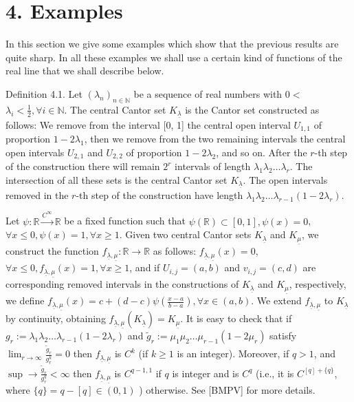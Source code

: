 \documentclass[10pt]{article}
\begin{document}
\section*{4. Examples}
In this section we give some examples which show that the previous results are quite sharp. In all these examples we shall use a certain kind of functions of the real line that we shall describe below.

Definition 4.1. Let $\left(\lambda_{n}\right)_{n \in \mathbb{N}}$ be a sequence of real numbers with $0<$ $\lambda_{i}<\frac{1}{2}, \forall i \in \mathbb{N}$. The central Cantor set $K_{\underline{\lambda}}$ is the Cantor set constructed as follows: We remove from the interval [0, 1] the central open interval $U_{1,1}$ of proportion $1-2 \lambda_{1}$, then we remove from the two remaining intervals the central open intervals $U_{2,1}$ and $U_{2,2}$ of proportion $1-2 \lambda_{2}$, and so on. After the $r$-th step of the construction there will remain $2^{r}$ intervals of length $\lambda_{1} \lambda_{2} \ldots \lambda_{r}$. The intersection of all these sets is the central Cantor set $K_{\underline{\lambda}}$. The open intervals removed in the $r$-th step of the construction have length $\lambda_{1} \lambda_{2} \ldots \lambda_{r-1}\left(1-2 \lambda_{r}\right)$.

Let $\psi: \mathbb{R} \xrightarrow{C^{\infty}} \mathbb{R}$ be a fixed function such that $\psi(\mathbb{R}) \subset[0,1], \psi(x)=0$, $\forall x \leq 0, \psi(x)=1, \forall x \geq 1$. Given two central Cantor sets $K_{\underline{\lambda}}$ and $K_{\underline{\mu}}$, we construct the function $f_{\underline{\lambda}, \underline{\mu}}: \mathbb{R} \rightarrow \mathbb{R}$ as follows: $f_{\underline{\lambda}, \underline{\mu}}(x)=0$, $\forall x \leq 0, f_{\underline{\lambda}, \underline{\mu}}(x)=1, \forall x \geq 1$, and if $U_{i, j}=(a, b)$ and $v_{i, j}=(c, d)$ are corresponding removed intervals in the constructions of $K_{\underline{\lambda}}$ and $K_{\underline{\mu}}$, respectively, we define $f_{\underline{\lambda}, \underline{\mu}}(x)=c+(d-c) \psi\left(\frac{x-a}{b-a}\right), \forall x \in(a, b)$. We extend $f_{\underline{\lambda}, \underline{\mu}}$ to $K_{\underline{\lambda}}$ by continuity, obtaining $f_{\underline{\lambda}, \underline{\mu}}\left(K_{\underline{\lambda}}\right)=K_{\underline{\mu}}$. It is easy to check that if $g_{r}:=\lambda_{1} \lambda_{2} \ldots \lambda_{r-1}\left(1-2 \lambda_{r}\right)$ and $\tilde{g}_{r}:=\mu_{1} \mu_{2} \ldots \mu_{r-1}\left(1-2 \mu_{r}\right)$ satisfy $\lim _{r \rightarrow \infty} \frac{\tilde{g}_{r}}{g_{r}^{k}}=0$ then $f_{\underline{\lambda}, \underline{\mu}}$ is $C^{k}$ (if $k \geq 1$ is an integer). Moreover, if $q>1$, and $\sup \rightarrow \frac{\tilde{g}_{r}}{g_{r}^{q}}<\infty$ then $f_{\underline{\lambda}, \underline{\mu}}$ is $C^{q-1,1}$ if $q$ is integer and is $C^{q}$ (i.e., it is $C^{[q]+\{q\}}$, where $\{q\}=q-[q] \in(0,1)$ ) otherwise. See [BMPV] for more details.
\end{document}
